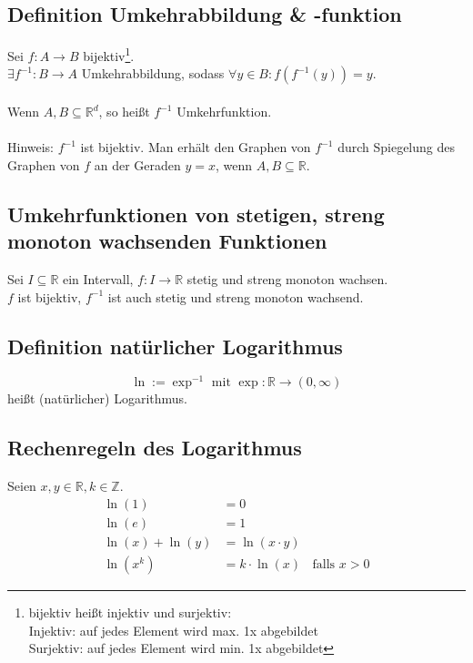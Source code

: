 \documentclass[halfparscip]{scrartcl}
\newcounter{subsection2}
\begin{document}
\subsection{Definition Umkehrabbildung \& -funktion}
Sei $f: A \rightarrow B$ bijektiv\footnote{bijektiv heißt injektiv und surjektiv:\\Injektiv: auf jedes Element wird max. 1x abgebildet\\Surjektiv: auf jedes Element wird min. 1x abgebildet}.\\
$\exists f^{-1} : B \rightarrow A$ Umkehrabbildung, sodass $\forall y \in B: f(f^{-1}(y)) = y$.\\\\
Wenn $A, B \subseteq \mathbb{R}^d$, so heißt $f^{-1}$ Umkehrfunktion.\\\\
Hinweis: $f^{-1}$ ist bijektiv. Man erhält den Graphen von $f^{-1}$ durch Spiegelung des Graphen von $f$ an der Geraden $y=x$, wenn $A, B \subseteq \mathbb{R}$.

\subsection{Umkehrfunktionen von stetigen, streng monoton wachsenden Funktionen}
Sei $I \subseteq \mathbb{R}$ ein Intervall, $f : I \rightarrow \mathbb{R}$ stetig und streng monoton wachsen.\\
$f$ ist bijektiv, $f^{-1}$ ist auch stetig und streng monoton wachsend.

\subsection{Definition natürlicher Logarithmus}
\begin{equation*}
	\ln := \exp^{-1} \text{ mit } \exp: \mathbb{R} \rightarrow (0, \infty)
\end{equation*}
heißt (natürlicher) Logarithmus.

\subsection*{Rechenregeln des Logarithmus}
Seien $x,y \in \mathbb{R}, k \in \mathbb{Z}$.
\begin{align*}
	\ln(1) &= 0 \\
	\ln(e) &= 1 \\
	\ln(x) + \ln(y) &= \ln(x \cdot y)\\
	\ln(x^k) &= k \cdot \ln(x)\;\;\text{ falls }x > 0
\end{align*}
\end{document}
